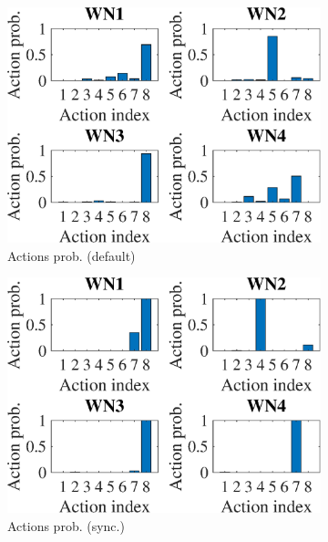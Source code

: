 \documentclass[preprint,12pt]{article}
\begin{document}
\begin{figure}[h!]
	\centering
	\begin{subfigure}[b]{.3\textwidth}
		\includegraphics[width=\textwidth]{images/actions_probability_EXP3}
		\caption{Actions prob. (default)}\label{fig:actions_probability_EXP3}
	\end{subfigure}
	\begin{subfigure}[b]{.3\textwidth}
		\includegraphics[width=\textwidth]{images/actions_probability_OEXP3}
		\caption{Actions prob. (sync.)}\label{fig:actions_probability_OEXP3}
	\end{subfigure}
	\begin{subfigure}[b]{.3\textwidth}

\end{subfigure}
\end{figure}
\end{document}
